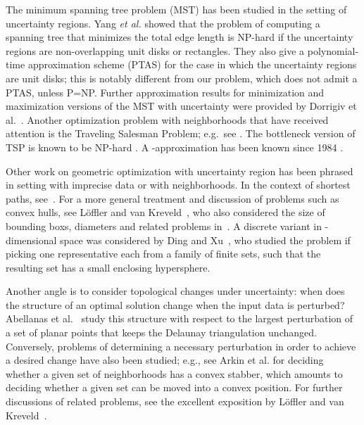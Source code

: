 The minimum spanning tree problem (MST) has been studied in the setting of
uncertainty regions. Yang {\em et al.} \cite{Yang07} showed that the problem of
computing a spanning tree that minimizes the total edge length is NP-hard if
the uncertainty regions are non-overlapping unit disks or rectangles. They also
give a polynomial-time approximation scheme (PTAS) for the case in which the
uncertainty regions are unit disks; this is notably different from our problem,
which does not admit a PTAS, unless P=NP. Further approximation results
for minimization and maximization versions of the MST with uncertainty were provided by 
Dorrigiv et al.~\cite{dfh+-mmwst-12}.
Another optimization problem with
neighborhoods that have received attention is the Traveling Salesman Problem;
e.g.\ see \cite{ah-aagcp-94,mm-aagtn-95,gl-faatn-99,dm-aatnp-01,delm-tsp-03,bgk+-tnvs-05,m-ptnfr-07}.
The bottleneck version of TSP is known to be NP-hard \cite[p.~212]{Garey_Johnson79}. 
A -approximation has been known since 1984 \cite{parker_rardin84}.

Other work on geometric optimization with uncertainty region has been phrased in setting with imprecise data or with neighborhoods. 
In the context of shortest paths, see~\cite{pk-aspas-10,dmmw-rsprm-14,dmm-mspip-15}.
For a more general treatment and discussion of problems such as convex hulls, see L{\"o}ffler and van Kreveld~\cite{lv-lschi-10},
who also considered the size of bounding boxs, diameters and related problems in~\cite{lv-lbbsm-10}.
A discrete variant in -dimensional space was considered by Ding and Xu~\cite{dx-scccp-11}, who studied
the problem if picking one representative each from a family of finite sets, such that the resulting set has
a small enclosing hypersphere.   

Another angle is to consider topological changes under uncertainty: when does the structure of an optimal solution change
when the input data is perturbed? Abellanas et al.~\cite{ahr-stdt-99} study this structure with respect to the largest 
perturbation of a set of planar points that keeps the Delaunay triangulation unchanged. Conversely, problems of determining
a necessary perturbation in order to achieve a desired change have also been studied; e.g., see Arkin et al.\cite{adk+-ct-11}
for deciding whether a given set of neighborhoods has a convex stabber, which amounts to deciding whether a given set
can be moved into a convex position. For further discussions of related problems, see the excellent exposition by
L{\"o}ffler and van Kreveld~\cite{lv-lschi-10}.

